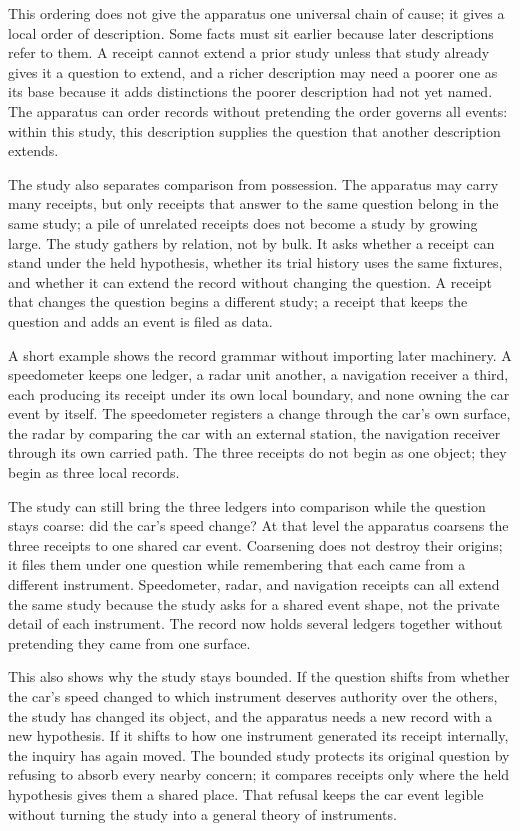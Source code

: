 This ordering does not give the apparatus one universal chain of cause; it gives a local order of description. Some facts must sit earlier because later descriptions refer to them. A receipt cannot extend a prior study unless that study already gives it a question to extend, and a richer description may need a poorer one as its base because it adds distinctions the poorer description had not yet named. The apparatus can order records without pretending the order governs all events: within this study, this description supplies the question that another description extends.

The study also separates comparison from possession. The apparatus may carry many receipts, but only receipts that answer to the same question belong in the same study; a pile of unrelated receipts does not become a study by growing large. The study gathers by relation, not by bulk. It asks whether a receipt can stand under the held hypothesis, whether its trial history uses the same fixtures, and whether it can extend the record without changing the question. A receipt that changes the question begins a different study; a receipt that keeps the question and adds an event is filed as data.

A short example shows the record grammar without importing later machinery. A speedometer keeps one ledger, a radar unit another, a navigation receiver a third, each producing its receipt under its own local boundary, and none owning the car event by itself. The speedometer registers a change through the car's own surface, the radar by comparing the car with an external station, the navigation receiver through its own carried path. The three receipts do not begin as one object; they begin as three local records.

The study can still bring the three ledgers into comparison while the question stays coarse: did the car's speed change? At that level the apparatus coarsens the three receipts to one shared car event. Coarsening does not destroy their origins; it files them under one question while remembering that each came from a different instrument. Speedometer, radar, and navigation receipts can all extend the same study because the study asks for a shared event shape, not the private detail of each instrument. The record now holds several ledgers together without pretending they came from one surface.

This also shows why the study stays bounded. If the question shifts from whether the car's speed changed to which instrument deserves authority over the others, the study has changed its object, and the apparatus needs a new record with a new hypothesis. If it shifts to how one instrument generated its receipt internally, the inquiry has again moved. The bounded study protects its original question by refusing to absorb every nearby concern; it compares receipts only where the held hypothesis gives them a shared place. That refusal keeps the car event legible without turning the study into a general theory of instruments.


